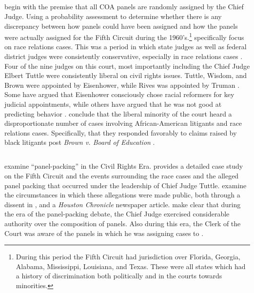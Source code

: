 \documentclass[12pt]{article}
\begin{document}
\subsection*{\cite{Atkins1974}}
\citet{Atkins1974} begin with the premise that all COA panels are randomly assigned by the Chief Judge.  Using a probability assessment to determine whether there is any discrepancy between how panels could have been assigned and how the panels were actually assigned for the Fifth Circuit during the 1960's.\footnote{During this period the Fifth Circuit had jurisdiction over Florida, Georgia, Alabama, Mississippi, Louisiana, and Texas.  These were all states which had a history of discrimination both politically and in the courts towards minorities.}  \citeauthor{Atkins1974} specifically focus on race relations cases.  This was a period in which state judges as well as federal district judges were consistently conservative, especially in race relations cases \citep{Atkins1974}.  Four of the nine judges on this court, most importantly including the Chief Judge Elbert Tuttle were consistently liberal on civil rights issues.  Tuttle, Wisdom, and Brown were appointed by Eisenhower, while Rives was appointed by Truman \citep{FJC}.   Some have argued that Eisenhower consciously chose racial reformers for key judicial appointments, while others have argued that he was not good at predicting behavior  \citep{kahn1992shattering,ambrose1984eisenhower}.  \cite{Atkins1974} conclude that the liberal minority of the court heard a disproportionate number of cases involving African-American litigants and race relations cases.  Specifically, that they responded favorably to claims raised by black litigants post \textit{Brown v. Board of Education} \citeyearpar{warren1954brown}.

\subsection*{\cite{Brown2000}}
\citet{Brown2000} examine ``panel-packing'' in the Civil Rights Era.  \citeauthor{Brown2000} provides a detailed case study on the Fifth Circuit and the events surrounding the race cases and the alleged panel packing that occurred under the leadership of Chief Judge Tuttle.  \citeauthor{Brown2000} examine the circumstances in which these allegations were made public, both through a dissent in \citet{Armstrong}, and a \textit{Houston Chronicle} newspaper article.  \citeauthor{Brown2000} make clear that during the era of the panel-packing debate, the Chief Judge exercised considerable authority over the composition of panels.  Also during this era, the Clerk of the Court was aware of the panels in which he was assigning cases to \citep{Brown2000}. 
\end{document}
